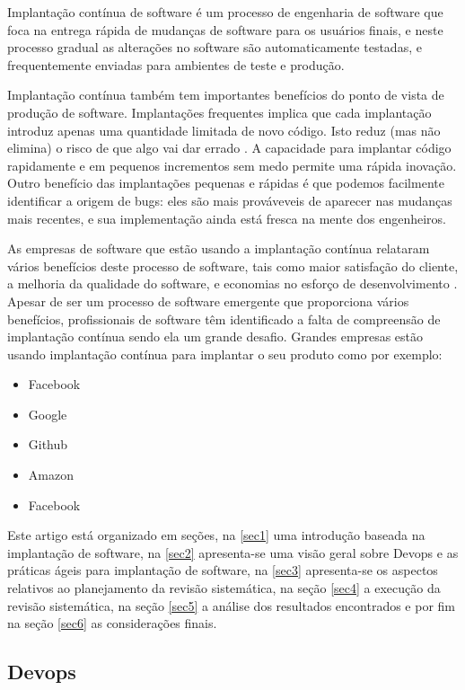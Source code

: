 \documentclass[12pt]{article}
\begin{document}
Implantação contínua de software é um processo de engenharia de software que foca na entrega rápida de mudanças de software para os usuários finais\cite{7284592}, e neste processo gradual as alterações no software são automaticamente testadas, e frequentemente enviadas para ambientes de teste e produção.

Implantação contínua também tem importantes benefícios do ponto de vista de produção de software. Implantações frequentes implica que cada implantação introduz apenas uma quantidade limitada de novo código. Isto reduz (mas não elimina) o risco de que algo vai dar errado \cite{6449236}. A capacidade para implantar código rapidamente e em pequenos incrementos sem medo permite uma rápida inovação. Outro benefício das implantações pequenas e rápidas  é que podemos facilmente identificar a origem de bugs: eles são mais prováveveis de aparecer nas mudanças mais recentes, e sua implementação ainda está fresca na mente dos engenheiros. 

As empresas de software que estão usando a implantação contínua
relataram vários benefícios deste processo de software, tais como
maior satisfação do cliente, a melhoria da qualidade do software,
e economias no esforço de desenvolvimento \cite{7057604}. Apesar de ser um processo de software emergente que proporciona vários benefícios, profissionais de software têm identificado a falta de
compreensão de implantação contínua sendo ela um grande desafio. Grandes empresas estão usando implantação contínua para implantar o seu produto \cite{7284592} como por exemplo:

\begin{itemize}
	\item Facebook
  	\item Google
	\item Github
  	\item Amazon
  	\item Facebook
\end{itemize}

Este artigo está organizado em seções, na \ref{sec1} uma introdução baseada na implantação de software, na \ref{sec2} apresenta-se uma visão geral sobre Devops e as práticas ágeis para implantação de software, na \ref{sec3} apresenta-se os aspectos relativos ao planejamento da revisão sistemática, na seção \ref{sec4} a execução da revisão sistemática, na seção \ref{sec5} a análise dos resultados encontrados e por fim na seção \ref{sec6} as considerações finais.

\subsection{Devops} \label{sec2:sub1}
\end{document}
